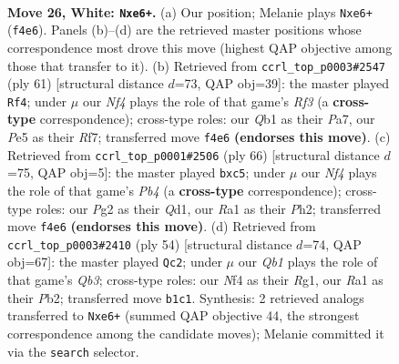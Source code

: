 \documentclass[11pt]{article}
\begin{document}
\clearpage

\begin{figure}[p]\centering
\begin{subfigure}{0.46\textwidth}\centering
\resizebox{\linewidth}{!}{%
\newchessgame
\chessboard[
  setfen={1nb2kr1/4n3/4p3/4Pp2/p1q2N2/P4K2/2P3Pp/RQ5R w - - 0 26},
  showmover=false,
  pgfstyle=straightmove, color=movearrow, markmove={f4-e6}
]}
\caption{}
\end{subfigure}\hfill
\begin{subfigure}{0.46\textwidth}\centering
\resizebox{\linewidth}{!}{%
\newchessgame
\chessboard[
  setfen={3k4/p3nr2/q4r1p/Pp1p3P/3Q4/6N1/2P1RPK1/R7 b - - 2 31},
  showmover=false,
  pgfstyle=straightmove, color=movearrow, markmove={f6-f4}
]}
\caption{}
\end{subfigure}
\\[4pt]
\begin{subfigure}{0.46\textwidth}\centering
\resizebox{\linewidth}{!}{%
\newchessgame
\chessboard[
  setfen={4r1k1/5pp1/pq3n1p/2p5/PP1R4/4N1P1/5P1P/3Q2K1 w - - 1 34},
  showmover=false,
  pgfstyle=straightmove, color=movearrow, markmove={b4-c5}
]}
\caption{}
\end{subfigure}\hfill
\begin{subfigure}{0.46\textwidth}\centering
\resizebox{\linewidth}{!}{%
\newchessgame
\chessboard[
  setfen={5rk1/p3bppp/p3p1n1/8/P2PPq2/1Q5R/1P3P2/2N2KR1 w - - 0 28},
  showmover=false,
  pgfstyle=straightmove, color=movearrow, markmove={b3-c2}
]}
\caption{}
\end{subfigure}
\caption{\textbf{Move 26, White: \texttt{Nxe6+}.} (a) Our position; Melanie plays \texttt{Nxe6+} (\texttt{f4e6}). Panels (b)--(d) are the retrieved master positions whose correspondence most drove this move (highest QAP objective among those that transfer to it). (b) Retrieved from \texttt{ccrl\_top\_p0003\#2547} (ply 61) [structural distance $d$=73, QAP obj=39]: the master played \texttt{Rf4}; under $\mu$ our \emph{Nf4} plays the role of that game's \emph{Rf3} (a \textbf{cross-type} correspondence); cross-type roles: our \emph{Q}b1 as their \emph{P}a7, our \emph{P}e5 as their \emph{R}f7; transferred move \texttt{f4e6} \textbf{(endorses this move)}. (c) Retrieved from \texttt{ccrl\_top\_p0001\#2506} (ply 66) [structural distance $d$=75, QAP obj=5]: the master played \texttt{bxc5}; under $\mu$ our \emph{Nf4} plays the role of that game's \emph{Pb4} (a \textbf{cross-type} correspondence); cross-type roles: our \emph{P}g2 as their \emph{Q}d1, our \emph{R}a1 as their \emph{P}h2; transferred move \texttt{f4e6} \textbf{(endorses this move)}. (d) Retrieved from \texttt{ccrl\_top\_p0003\#2410} (ply 54) [structural distance $d$=74, QAP obj=67]: the master played \texttt{Qc2}; under $\mu$ our \emph{Qb1} plays the role of that game's \emph{Qb3}; cross-type roles: our \emph{N}f4 as their \emph{R}g1, our \emph{R}a1 as their \emph{P}b2; transferred move \texttt{b1c1}. Synthesis: 2 retrieved analogs transferred to \texttt{Nxe6+} (summed QAP objective 44, the strongest correspondence among the candidate moves); Melanie committed it via the \texttt{search} selector.}
\label{fig:thought-m50}
\end{figure}
\end{document}
